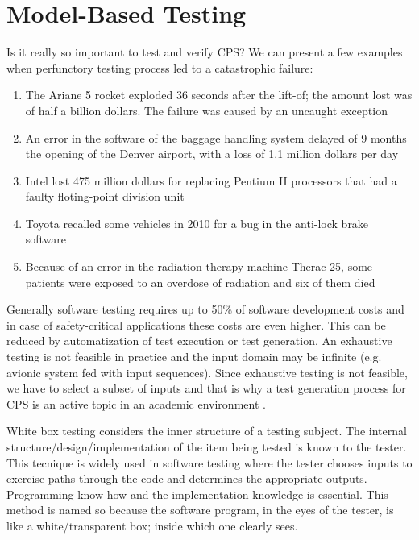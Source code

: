 \section{Model-Based Testing} \label{sec:num3}

Is it really so important to test and verify CPS? We can present a few examples when perfunctory testing process led to a catastrophic failure:

\begin{enumerate}
	\item The Ariane 5 rocket exploded 36 seconds after the lift-of; the amount lost was of half a billion dollars. The failure was caused by an uncaught exception \cite{Ariane5:Failure}
	\item An error in the software of the baggage handling system delayed of 9 months the opening of the Denver airport, with a loss of 1.1 million dollars per day \cite{Donaldson:DenverAirportProblem}
	\item Intel lost 475 million dollars for replacing Pentium II processors that had a faulty floting-point division unit \cite{Khan:IndustrialInformatics}
	\item Toyota recalled some vehicles in 2010 for a bug in the anti-lock brake software \cite{Fan:Toyota}
	\item Because of an error in the radiation therapy machine Therac-25, some patients were exposed to an overdose of radiation and six of them died \cite{Leveson:Therac25}
\end{enumerate}

Generally software testing requires up to 50\% of software development costs and in case of safety-critical applications these costs are even higher. This can be reduced by automatization of test execution or test generation. An exhaustive testing is not feasible in practice and the input domain may be infinite (e.g. avionic system fed with input sequences). Since exhaustive testing is not feasible, we have to select a subset of inputs and that is why a test generation process for CPS is an active topic in an academic environment \cite{Ratschan:AutomaticAnalysisCPS}.

White box testing considers the inner structure of a testing subject. The internal structure/design/implementation of the item being tested is known to the tester. This tecnique is widely used in software testing where the tester chooses inputs to exercise paths through the code and determines the appropriate outputs. Programming know-how and the implementation knowledge is essential. This method is named so because the software program, in the eyes of the tester, is like a white/transparent box; inside which one clearly sees.

